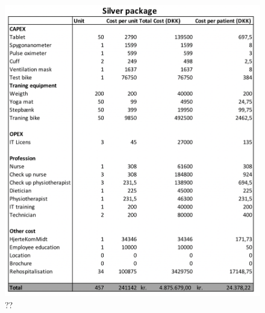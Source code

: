 \begin{figure}[H]
\centering
\includegraphics[width=1\textwidth]{Figure/Silver.png}
\caption{??}
\label{fig: silver}
\end{figure} 

